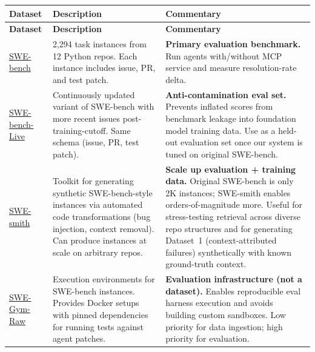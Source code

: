 \documentclass[a4paper,12pt]{article}
\begin{document}
\footnotesize
\begin{longtable}{@{} p{3cm} p{5cm} p{7cm} @{}}

\toprule
\textbf{Dataset} & \textbf{Description} & \textbf{Commentary} \\
\midrule
\endfirsthead

\toprule
\textbf{Dataset} & \textbf{Description} & \textbf{Commentary} \\
\midrule
\endhead

\bottomrule
\endfoot

\href{https://www.swebench.com/original.html}{SWE-bench} &
2,294 task instances from 12 Python repos. Each instance includes issue, PR, and test patch. &
\textbf{Primary evaluation benchmark.} Run agents with/without MCP service and measure resolution-rate delta. \\

\href{https://huggingface.co/datasets/SWE-bench-Live/SWE-bench-Live}{SWE-bench-Live} &
Continuously updated variant of SWE-bench with more recent issues post-training-cutoff. Same schema (issue, PR, test patch). &
\textbf{Anti-contamination eval set.} Prevents inflated scores from benchmark leakage into foundation model training data. Use as a held-out evaluation set once our system is tuned on original SWE-bench. \\

\href{https://github.com/SWE-bench/SWE-smith}{SWE-smith} &
Toolkit for generating synthetic SWE-bench-style instances via automated code transformations (bug injection, context removal). Can produce instances at scale on arbitrary repos. &
\textbf{Scale up evaluation + training data.} Original SWE-bench is only 2K instances; SWE-smith enables orders-of-magnitude more. Useful for stress-testing retrieval across diverse repo structures and for generating Dataset~1 (context-attributed failures) synthetically with known ground-truth context. \\

\href{https://huggingface.co/datasets/SWE-Gym/SWE-Gym-Raw}{SWE-Gym-Raw} &
Execution environments for SWE-bench instances. Provides Docker setups with pinned dependencies for running tests against agent patches. &
\textbf{Evaluation infrastructure (not a dataset).} Enables reproducible eval harness execution and avoids building custom sandboxes. Low priority for data ingestion; high priority for evaluation. \\


\end{longtable}
\end{document}
